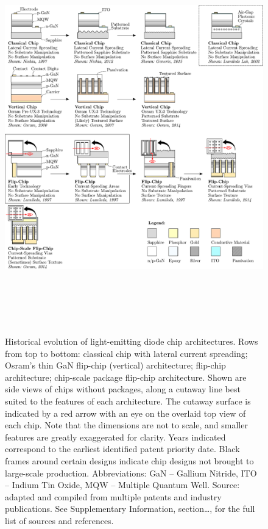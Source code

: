 \documentclass[twoside,twocolumn,9pt]{article}
\begin{document}
\begin{figure}
 \centering
 \includegraphics[height=17cm]{2_SSL_EES/article/figures/chip_architecture_overview.pdf}
 \caption{Historical evolution of light-emitting diode chip architectures. Rows from top to bottom: classical chip with lateral current spreading; Osram’s thin GaN flip-chip (vertical) architecture; flip-chip architecture; chip-scale package flip-chip architecture. Shown are side views of chips without packages, along a cutaway line best suited to the features of each architecture. The cutaway surface is indicated by a red arrow with an eye on the overlaid top view of each chip. Note that the dimensions are not to scale, and smaller features are greatly exaggerated for clarity. Years indicated correspond to the earliest identified patent priority date. Black frames around certain designs indicate chip designs not brought to large-scale production. Abbreviations: GaN – Gallium Nitride, ITO – Indium Tin Oxide, MQW – Multiple Quantum Well. Source: adapted and compiled from multiple patents and industry publications. See Supplementary Information, section…, for the full list of sources and references.}
 \label{fgr:chip_architecture_overview}
\end{figure}
\end{document}
